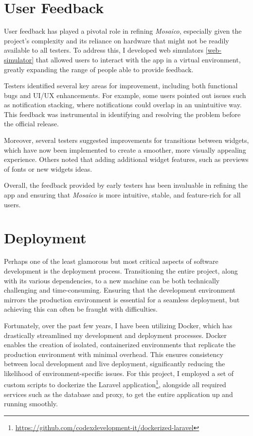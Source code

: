 \section{User Feedback}

User feedback has played a pivotal role in refining \textit{Mosaico}, especially given the project's complexity and its reliance on hardware that might not be readily available to all testers. To address this, I developed web simulators \ref{web-simulator} that allowed users to interact with the app in a virtual environment, greatly expanding the range of people able to provide feedback.

Testers identified several key areas for improvement, including both functional bugs and UI/UX enhancements. For example, some users pointed out issues such as notification stacking, where notifications could overlap in an unintuitive way. This feedback was instrumental in identifying and resolving the problem before the official release.

Moreover, several testers suggested improvements for transitions between widgets, which have now been implemented to create a smoother, more visually appealing experience. Others noted that adding additional widget features, such as previews of fonts or new widgets ideas.

Overall, the feedback provided by early testers has been invaluable in refining the app and ensuring that \textit{Mosaico} is more intuitive, stable, and feature-rich for all users.


\section{Deployment} Perhaps one of the least glamorous but most critical aspects of software development is the deployment process. Transitioning the entire project, along with its various dependencies, to a new machine can be both technically challenging and time-consuming. Ensuring that the development environment mirrors the production environment is essential for a seamless deployment, but achieving this can often be fraught with difficulties.

Fortunately, over the past few years, I have been utilizing Docker, which has drastically streamlined my development and deployment processes. Docker enables the creation of isolated, containerized environments that replicate the production environment with minimal overhead. This ensures consistency between local development and live deployment, significantly reducing the likelihood of environment-specific issues. For this project, I employed a set of custom scripts to dockerize the Laravel application\footnote{\url{https://github.com/codexdevelopment-it/dockerized-laravel}}, alongside all required services such as the database and proxy, to get the entire application up and running smoothly.

